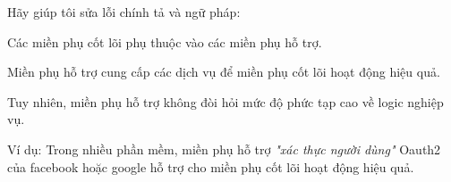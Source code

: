 Hãy giúp tôi sửa lỗi chính tả và ngữ pháp:

Các miền phụ cốt lõi phụ thuộc vào các miền phụ hỗ trợ.

Miền phụ hỗ trợ cung cấp các dịch vụ để miền phụ cốt lõi hoạt động hiệu quả.

Tuy nhiên, miền phụ hỗ trợ không đòi hỏi mức độ phức tạp cao về logic nghiệp vụ.

Ví dụ: Trong nhiều phần mềm, miền phụ hỗ trợ \textit{"xác thực người dùng"} Oauth2 của facebook hoặc google hỗ trợ cho miền phụ cốt lõi hoạt động hiệu quả.

